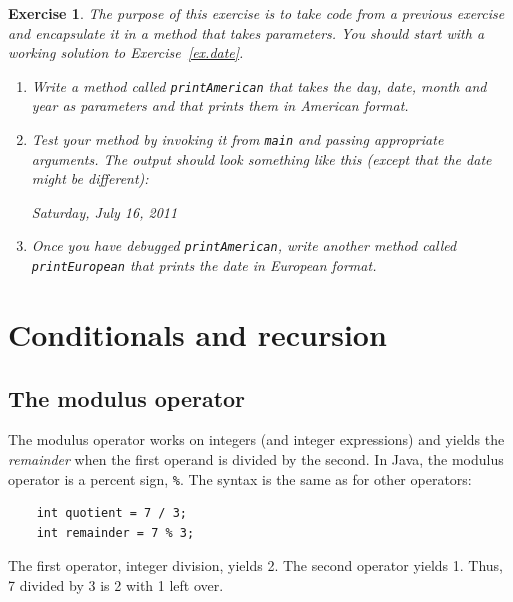 \documentclass[12pt]{book}
\theoremstyle{exercise}
\newtheorem{exercise}{Exercise}[chapter]
\begin{document}
\begin{exercise}

The purpose of this exercise is to take code from a previous exercise
and encapsulate it in a method that takes parameters.  You should
start with a working solution to Exercise~\ref{ex.date}.

\begin{enumerate}

\item Write a method called {\tt printAmerican}
that takes the day, date, month and year as parameters and that
prints them in American format.

\item Test your method by invoking it from {\tt main} and passing
appropriate arguments.  The output should look something like this
(except that the date might be different):
%
\begin{verbatimtab}
Saturday, July 16, 2011
\end{verbatimtab}
%
\item Once you have debugged {\tt printAmerican}, write another
method called {\tt printEuropean} that prints the date in
European format.

\end{enumerate}
\end{exercise}



\chapter{Conditionals and recursion}
\label{chap04}
\label{condrecursion}

\section{The modulus operator}

The modulus operator works on integers (and integer expressions)
and yields the {\em remainder} when the first operand is divided
by the second.  In Java, the modulus operator is a percent sign,
{\tt \%}.  The syntax is the same as for other operators:

\begin{lstlisting}
    int quotient = 7 / 3;
    int remainder = 7 % 3;
\end{lstlisting}
%
The first operator, integer division, yields 2.  The second
operator yields 1.  Thus, 7 divided by 3 is 2 with 1 left over.
\end{document}
